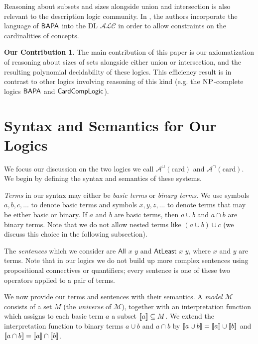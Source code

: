 \documentclass[letterpaper]{article}
\theoremstyle{definition}
\newtheorem*{contribution*}{Our Contribution}
\newcommand{\semantics}[1]{[\![\mbox{\em $ #1 $\/}]\!]}
\newcommand{\Aunion}{\mathscr{A}^{\cup}}
\newcommand{\Ainter}{\mathscr{A}^{\cap}}
\newcommand{\BAPA}{\sf{BAPA}}
\newcommand{\CardCompLogic}{\sf{CardCompLogic}}
\newcommand{\NP}{\textsc{NP}}
\newcommand{\All}[2]{\mathsf{All}\,\,#1\,\,#2}
\newcommand{\Atleast}[2]{\mathsf{AtLeast}\,\,#1\,\,#2}
\newcommand{\card}{\mathrm{card}}
\begin{document}
Reasoning about subsets and sizes alongside union and intersection is also relevant to the description logic community.  In \cite{extending_description_logic_ALC}, the authors incorporate the language of $\BAPA$ into the DL $\mathcal{ALC}$ in order to allow constraints on the cardinalities of concepts.

\begin{contribution*}
The main contribution of this paper is our axiomatization of reasoning about sizes of sets alongside either union or intersection, and the resulting polynomial decidability of these logics.  This efficiency result is in contrast to other logics involving reasoning of this kind (e.g. the $\NP$-complete logics $\BAPA$ and $\CardCompLogic$).
\end{contribution*}

\section{Syntax and Semantics for Our Logics}\label{s:logics}

We focus our discussion on the two logics we call $\Aunion(\card)$ and $\Ainter(\card)$. We begin by defining the syntax and semantics of these systems.

\emph{Terms} in our syntax may either be \emph{basic terms} or \emph{binary terms}.  We use symbols $a, b, c, \ldots$ to denote basic terms and symbols $x, y, z, \ldots$ to denote terms that may be either basic or binary. If $a$ and $b$ are basic terms, then $a \cup b$ and $a \cap b$ are binary terms. Note that we do not allow nested terms like $(a\cup b)\cup c$ (we discuss this choice in the following subsection). 

The \emph{sentences} which we consider are $\All{x}{y}$ and $\Atleast{x}{y}$, where $x$ and $y$ are terms.
Note that in our logics we do not build up more complex sentences using propositional connectives or quantifiers; every sentence is one of these two operators applied to a pair of terms.

We now provide our terms and sentences with their semantics.  A \emph{model} $\mathcal{M}$ consists of a set $M$ (the \emph{universe} of $\mathcal{M}$), together with an interpretation function which assigns to each basic term $a$ a subset $\semantics{a} \subseteq M$.  We extend the interpretation function to binary terms $a \cup b$ and $a \cap b$ by $\semantics{a \cup b} = \semantics{a} \cup \semantics{b}$ and $\semantics{a \cap b} = \semantics{a} \cap \semantics{b}$.
\end{document}
